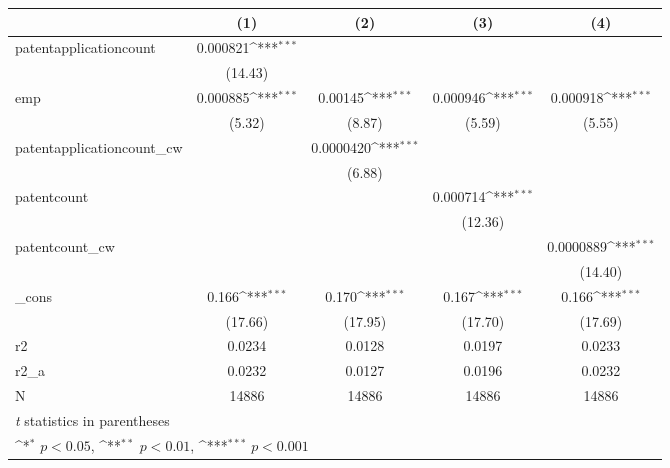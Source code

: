 {
\def\sym#1{\ifmmode^{#1}\else\(^{#1}\)\fi}
\begin{tabular}{l*{4}{c}}
\hline\hline
            &\multicolumn{1}{c}{(1)}         &\multicolumn{1}{c}{(2)}         &\multicolumn{1}{c}{(3)}         &\multicolumn{1}{c}{(4)}         \\
\hline
patentapplicationcount&    0.000821\sym{***}&                     &                     &                     \\
            &     (14.43)         &                     &                     &                     \\
[1em]
emp         &    0.000885\sym{***}&     0.00145\sym{***}&    0.000946\sym{***}&    0.000918\sym{***}\\
            &      (5.32)         &      (8.87)         &      (5.59)         &      (5.55)         \\
[1em]
patentapplicationcount\_cw&                     &   0.0000420\sym{***}&                     &                     \\
            &                     &      (6.88)         &                     &                     \\
[1em]
patentcount &                     &                     &    0.000714\sym{***}&                     \\
            &                     &                     &     (12.36)         &                     \\
[1em]
patentcount\_cw&                     &                     &                     &   0.0000889\sym{***}\\
            &                     &                     &                     &     (14.40)         \\
[1em]
\_cons      &       0.166\sym{***}&       0.170\sym{***}&       0.167\sym{***}&       0.166\sym{***}\\
            &     (17.66)         &     (17.95)         &     (17.70)         &     (17.69)         \\
\hline
r2          &      0.0234         &      0.0128         &      0.0197         &      0.0233         \\
r2\_a        &      0.0232         &      0.0127         &      0.0196         &      0.0232         \\
N           &       14886         &       14886         &       14886         &       14886         \\
\hline\hline
\multicolumn{5}{l}{\footnotesize \textit{t} statistics in parentheses}\\
\multicolumn{5}{l}{\footnotesize \sym{*} \(p<0.05\), \sym{**} \(p<0.01\), \sym{***} \(p<0.001\)}\\
\end{tabular}
}

